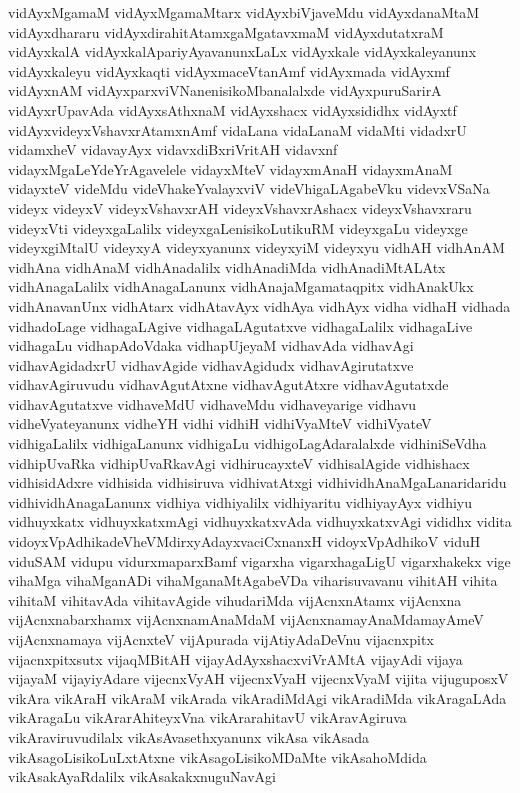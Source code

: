 {vidAyxMgamaM
vidAyxMgamaMtarx
vidAyxbiVjaveMdu
vidAyxdanaMtaM
vidAyxdhararu
vidAyxdirahitAtamxgaMgatavxmaM
vidAyxdutatxraM
vidAyxkalA
vidAyxkalApariyAyavanunxLaLx
vidAyxkale
vidAyxkaleyanunx
vidAyxkaleyu
vidAyxkaqti
vidAyxmaceVtanAmf
vidAyxmada
vidAyxmf
vidAyxnAM
vidAyxparxviVNanenisikoMbanalalxde
vidAyxpuruSarirA
vidAyxrUpavAda
vidAyxsAthxnaM
vidAyxshacx
vidAyxsididhx
vidAyxtf
vidAyxvideyxVshavxrAtamxnAmf
vidaLana
vidaLanaM
vidaMti
vidadxrU
vidamxheV
vidavayAyx
vidavxdiBxriVritAH
vidavxnf
vidayxMgaLeYdeYrAgavelele
vidayxMteV
vidayxmAnaH
vidayxmAnaM
vidayxteV
videMdu
videVhakeYvalayxviV
videVhigaLAgabeVku
videvxVSaNa
videyx
videyxV
videyxVshavxrAH
videyxVshavxrAshacx
videyxVshavxraru
videyxVti
videyxgaLalilx
videyxgaLenisikoLutikuRM
videyxgaLu
videyxge
videyxgiMtalU
videyxyA
videyxyanunx
videyxyiM
videyxyu
vidhAH
vidhAnAM
vidhAna
vidhAnaM
vidhAnadalilx
vidhAnadiMda
vidhAnadiMtALAtx
vidhAnagaLalilx
vidhAnagaLanunx
vidhAnajaMgamataqpitx
vidhAnakUkx
vidhAnavanUnx
vidhAtarx
vidhAtavAyx
vidhAya
vidhAyx
vidha
vidhaH
vidhada
vidhadoLage
vidhagaLAgive
vidhagaLAgutatxve
vidhagaLalilx
vidhagaLive
vidhagaLu
vidhapAdoVdaka
vidhapUjeyaM
vidhavAda
vidhavAgi
vidhavAgidadxrU
vidhavAgide
vidhavAgidudx
vidhavAgirutatxve
vidhavAgiruvudu
vidhavAgutAtxne
vidhavAgutAtxre
vidhavAgutatxde
vidhavAgutatxve
vidhaveMdU
vidhaveMdu
vidhaveyarige
vidhavu
vidheVyateyanunx
vidheYH
vidhi
vidhiH
vidhiVyaMteV
vidhiVyateV
vidhigaLalilx
vidhigaLanunx
vidhigaLu
vidhigoLagAdaralalxde
vidhiniSeVdha
vidhipUvaRka
vidhipUvaRkavAgi
vidhirucayxteV
vidhisalAgide
vidhishacx
vidhisidAdxre
vidhisida
vidhisiruva
vidhivatAtxgi
vidhividhAnaMgaLanaridaridu
vidhividhAnagaLanunx
vidhiya
vidhiyalilx
vidhiyaritu
vidhiyayAyx
vidhiyu
vidhuyxkatx
vidhuyxkatxmAgi
vidhuyxkatxvAda
vidhuyxkatxvAgi
vididhx
vidita
vidoyxVpAdhikadeVheVMdirxyAdayxvaciCxnanxH
vidoyxVpAdhikoV
viduH
viduSAM
vidupu
vidurxmaparxBamf
vigarxha
vigarxhagaLigU
vigarxhakekx
vige
vihaMga
vihaMganADi
vihaMganaMtAgabeVDa
viharisuvavanu
vihitAH
vihita
vihitaM
vihitavAda
vihitavAgide
vihudariMda
vijAcnxnAtamx
vijAcnxna
vijAcnxnabarxhamx
vijAcnxnamAnaMdaM
vijAcnxnamayAnaMdamayAmeV
vijAcnxnamaya
vijAcnxteV
vijApurada
vijAtiyAdaDeVnu
vijacnxpitx
vijacnxpitxsutx
vijaqMBitAH
vijayAdAyxshacxviVrAMtA
vijayAdi
vijaya
vijayaM
vijayiyAdare
vijecnxVyAH
vijecnxVyaH
vijecnxVyaM
vijita
vijuguposxV
vikAra
vikAraH
vikAraM
vikArada
vikAradiMdAgi
vikAradiMda
vikAragaLAda
vikAragaLu
vikArarAhiteyxVna
vikArarahitavU
vikAravAgiruva
vikAraviruvudilalx
vikAsAvasethxyanunx
vikAsa
vikAsada
vikAsagoLisikoLuLxtAtxne
vikAsagoLisikoMDaMte
vikAsahoMdida
vikAsakAyaRdalilx
vikAsakakxnuguNavAgi
}
